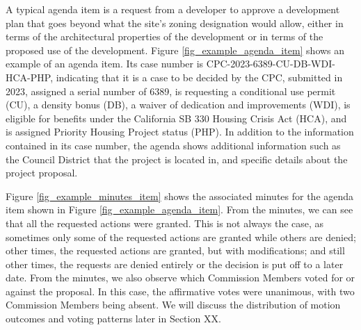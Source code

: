 A typical agenda item is a request from a developer to approve a development plan that goes beyond what the site's zoning designation would allow, either in terms of the architectural properties of the development or in terms of the proposed use of the development. Figure \ref{fig_example_agenda_item} shows an example of an agenda item. Its case number is CPC-2023-6389-CU-DB-WDI-HCA-PHP, indicating that it is a case to be decided by the CPC, submitted in 2023, assigned a serial number of 6389, is requesting a conditional use permit (CU), a density bonus (DB), a waiver of dedication and improvements (WDI), is eligible for benefits under the California SB 330 Housing Crisis Act (HCA), and is assigned Priority Housing Project status (PHP). In addition to the information contained in its case number, the agenda shows additional information such as the Council District that the project is located in, and specific details about the project proposal. 

Figure \ref{fig_example_minutes_item} shows the associated minutes for the agenda item shown in Figure \ref{fig_example_agenda_item}. From the minutes, we can see that all the requested actions were granted. This is not always the case, as sometimes only some of the requested actions are granted while others are denied; other times, the requested actions are granted, but with modifications; and still other times, the requests are denied entirely or the decision is put off to a later date. From the minutes, we also observe which Commission Members voted for or against the proposal. In this case, the affirmative votes were unanimous, with two Commission Members being absent. We will discuss the distribution of motion outcomes and voting patterns later in Section XX.





